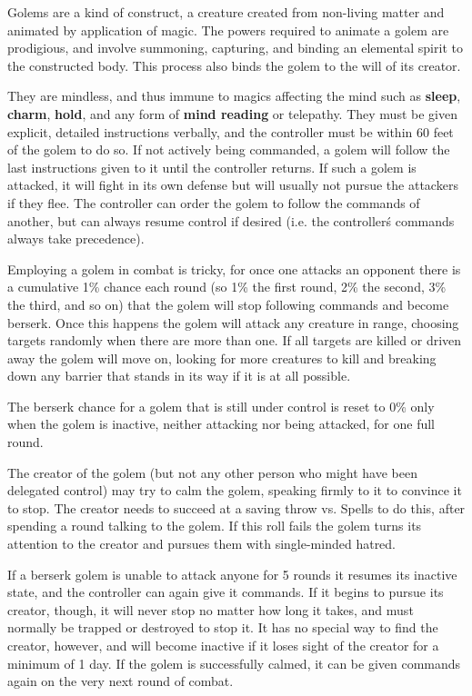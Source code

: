 \documentclass[a4paper,twoside,openany,10pt]{book}
\begin{document}
\begin{multicols}{2}
Golems are a kind of construct, a creature created from non-living matter and animated by application of magic. The powers required to animate a golem are prodigious, and involve summoning, capturing, and binding an elemental spirit to the constructed body. This process also binds the golem to the will of its creator.

They are mindless, and thus immune to magics affecting the mind such as \textbf{sleep}, \textbf{charm}, \textbf{hold}, and any form of \textbf{mind reading} or telepathy. They must be given explicit, detailed instructions verbally, and the controller must be within 60 feet of the golem to do so. If not actively being commanded, a golem will follow the last instructions given to it until the controller returns. If such a golem is attacked, it will fight in its own defense but will usually not pursue the attackers if they flee. The controller can order the golem to follow the commands of another, but can always resume control if desired (i.e. the controller\'s commands always take precedence).

Employing a golem in combat is tricky, for once one attacks an opponent there is a cumulative 1\% chance each round (so 1\% the first round, 2\% the second, 3\% the third, and so on) that the golem will stop following commands and become berserk. Once this happens the golem will attack any creature in range, choosing targets randomly when there are more than one. If all targets are killed or driven away the golem will move on, looking for more creatures to kill and breaking down any barrier that stands in its way if it is at all possible. 

The berserk chance for a golem that is still under control is reset to 0\% only when the golem is inactive, neither attacking nor being attacked, for one full round.

The creator of the golem (but not any other person who might have been delegated control) may try to calm the golem, speaking firmly to it to convince it to stop. The creator needs to succeed at a saving throw vs. Spells to do this, after spending a round talking to the golem. If this roll fails the golem turns its attention to the creator and pursues them with single-minded hatred.

If a berserk golem is unable to attack anyone for 5 rounds it resumes its inactive state, and the controller can again give it commands. If it begins to pursue its creator, though, it will never stop no matter how long it takes, and must normally be trapped or destroyed to stop it. It has no special way to find the creator, however, and will become inactive if it loses sight of the creator for a minimum of 1 day. If the golem is successfully calmed, it can be given commands again on the very next round of combat.


\end{multicols}
\end{document}
